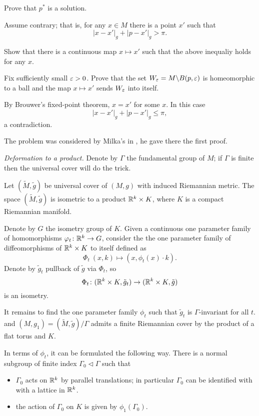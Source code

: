 Prove that $p^*$ is a solution.

Assume contrary;
that is, for any $x\in M$ there is a point $x'$ such that 
\[|x-x'|_g+|p-x'|_g>\pi.\]

Show that there is a continuous map $x\mapsto x'$
such that the above inequaliy holds for any $x$.

Fix sufficiently small $\varepsilon>0$.
Prove that the set $W_\varepsilon=M\backslash B(p,\varepsilon)$ 
is homeomorphic to a ball 
and the map $x\mapsto x'$ sends $W_\varepsilon$ into itself.

By Brouwer's fixed-point theorem, $x=x'$ for some $x$.
In this case 
\[|x-x'|_g+|p-x'|_g\le \pi,\]
a contradiction.
 
The problem was considered by Milka's in \cite{milka-poly}, he gave there the first proof.

\textit{Deformation to a product.} 
Denote by $\Gamma$ the fundamental group of $M$;
if $\Gamma$ is finite then the universal cover will do the trick.

Let $(\tilde M,\tilde g)$ be universal cover of $(M,g)$ with induced Riemannian metric.
The space $(\tilde M,\tilde g)$ is isometric to a product $\mathbb{R}^k\times K$, where $K$ is a compact Riemannian manifold.

Denote by $G$ the isometry group of $K$.
Given a continuous one parameter family of homomorphisms $\varphi_t\colon\mathbb{R}^k\to G$,
consider the the  one parameter family of diffeomorphisms of $\mathbb{R}^k\times K$ to itself defined as
\[\Phi_t\:(x,k)\mapsto (x,\phi_t(x)\cdot k).\]
Denote by 
 $\tilde g_t$ pullback 
of $\tilde g$ via $\Phi_t$,
so 
\[\Phi_t\colon(\mathbb{R}^k\times K,\tilde g_t)\to (\mathbb{R}^k\times K,\tilde g)\]
is an isometry.

It remains to find the one parameter family $\phi_t$ such that 
 $\tilde g_t$ is $\Gamma$-invariant for all $t$.
and $(M,g_1)=(\tilde M,\tilde g)/\Gamma$ admits a finite Riemannian cover by the product of a flat torus and $K$.


In terms of $\phi_t$, it can be formulated the following way.
There is a normal subgroup of finite index $\Gamma_0\vartriangleleft\Gamma$ such that 
\begin{itemize}
\item $\Gamma_0$ acts on $\mathbb{R}^k$ by parallel translations; 
in particular $\Gamma_0$ can be identified with with a lattice in $\mathbb{R}^k$.
\item the action of $\Gamma_0$ on $K$ is given by $\phi_1(\Gamma_0)$.
\end{itemize}


